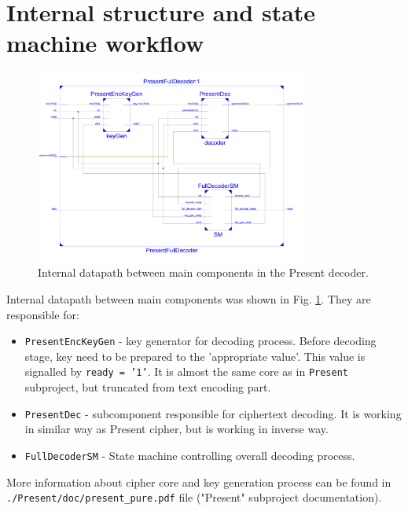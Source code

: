 \documentclass{gajewski}
\begin{document}
\newpage

\section{Internal structure and state machine workflow}

\begin{figure}[!ht]%
    \begin{center}
    \includegraphics[width=0.8\textwidth]{img/internalStructure.png}
    \caption{%
        Internal datapath between main components in the Present decoder.
     }%
    \label{internalStructure}
    \end{center}
 \end{figure}

Internal datapath between main components was shown in Fig. \ref{internalStructure}. They are responsible for:

\begin{itemize}
    \item \texttt{PresentEncKeyGen} - key generator for decoding process. Before decoding stage, key need to be prepared to the 'appropriate value'. This value is signalled by \texttt{ready = '1'}. It is almost the same core as in \texttt{Present} subproject, but truncated from text encoding part.
    \item \texttt{PresentDec} - subcomponent responsible for ciphertext decoding. It is working in similar way as Present cipher, but is working in inverse way.
    \item \texttt{FullDecoderSM} - State machine controlling overall decoding process.
\end{itemize}

More information about cipher core and key generation process can be found in \\ \texttt{./Present/doc/present\_pure.pdf} file ("Present" subproject documentation).
\end{document}
